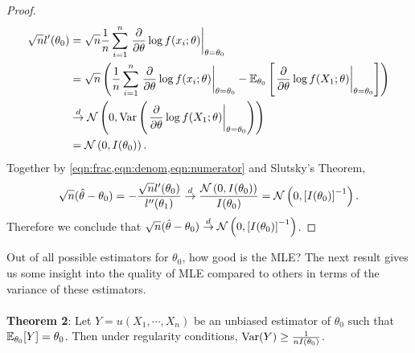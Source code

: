 \begin{proof}
\begin{align}
\sqrt{n}l'(\theta_0) &= \sqrt{n}\frac{1}{n}\sum_{i=1}^n \left.\frac{\partial}{\partial\theta}\log f(x_i;\theta)\right\vert_{\theta=\theta_0}\nonumber\\
&= \sqrt{n}\left( \frac{1}{n}\sum_{i=1}^n \left.\frac{\partial}{\partial\theta}\log f(x_i;\theta)\right\vert_{\theta=\theta_0} - \mathbb{E}_{\theta_0}\left[ \left.\frac{\partial}{\partial\theta}\log f(X_1;\theta)\right\vert_{\theta=\theta_0} \right] \right)\nonumber\\
&\overset{d}{\rightarrow} \mathcal{N}\left(0, \text{Var}\left( \left.\frac{\partial}{\partial\theta}\log f(X_1;\theta)\right\vert_{\theta=\theta_0} \right)\right)\nonumber\\
&= \mathcal{N}\left( 0, I(\theta_0) \right). \label{eqn:numerator}
\end{align}
Together by \cref{eqn:frac,eqn:denom,eqn:numerator} and Slutsky's Theorem,
\begin{align*}
\sqrt{n}(\hat{\theta} - \theta_0) = -\frac{\sqrt{n}l'(\theta_0)}{l''(\theta_1)} \overset{d}{\rightarrow} \frac{\mathcal{N}\left(0,I(\theta_0)\right)}{I(\theta_0)} = \mathcal{N}\left(0, \left[ I(\theta_0) \right]^{-1}\right).
\end{align*}
Therefore we conclude that $\sqrt{n}(\hat{\theta} - \theta_0)\overset{d}{\rightarrow}\mathcal{N}\left(0, \left[ I(\theta_0) \right]^{-1}\right)$.
\end{proof}
$ $\\
Out of all possible estimators for $\theta_0$, how good is the MLE? The next result gives us some insight into the quality of MLE compared to others in terms of the variance of these estimators.\\\\
\textbf{Theorem 2}: Let $Y = u(X_1,\cdots,X_n)$ be an unbiased estimator of $\theta_0$ such that $\mathbb{E}_{\theta_0}[Y] = \theta_0$. Then under regularity conditions, $\text{Var}(Y) \geq \frac{1}{nI(\theta_0)}$.
